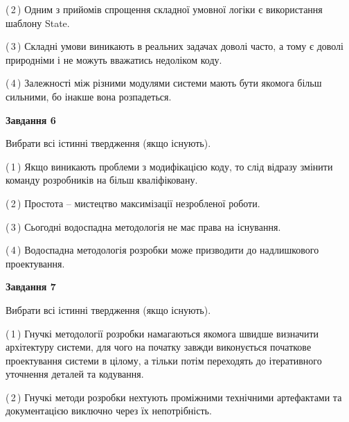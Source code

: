 \documentclass[10pt, ukrainian]{article}
\begin{document}
{\begin {large}
(\,2\,) Одним з прийомів спрощення складної умовної логіки є використання шаблону State. %



(\,3\,) Складні умови виникають в реальних задачах доволі часто, а тому є доволі природніми і не можуть вважатись недоліком коду. %



(\,4\,) Залежності між різними модулями системи мають бути якомога більш сильними, бо інакше вона розпадеться. %

\newpage

{\begin {center}\textbf{Завдання 6}\end {center}}\par
Вибрати всі істинні твердження (якщо існують).\par
\vspace{2mm}



(\,1\,) Якщо виникають проблеми з модифікацією коду, то слід відразу змінити команду розробників на більш кваліфіковану.%



(\,2\,) Простота – мистецтво максимізації незробленої роботи. %



(\,3\,) Сьогодні водоспадна методологія не має права на існування. %



(\,4\,) Водоспадна методологія розробки може призводити до надлишкового проектування. %


{\begin {center}\textbf{Завдання 7}\end {center}}\par
Вибрати всі істинні твердження (якщо існують).\par
\vspace{2mm}



(\,1\,) Гнучкі методології розробки намагаються якомога швидше визначити архітектуру системи, для чого на початку завжди виконується початкове проектування системи в цілому, а тільки потім переходять до ітеративного уточнення деталей та кодування. %



(\,2\,) Гнучкі методи розробки нехтують проміжними технічними артефактами та документацією виключно через їх непотрібність. %




\end{large}}
\end{document}
